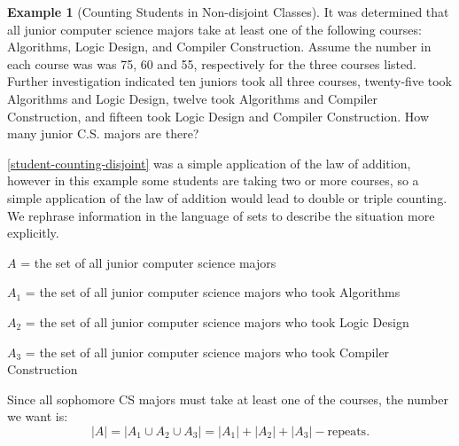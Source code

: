 \documentclass[10pt,]{book}
\theoremstyle{plain}
\theoremstyle{definition}
\newtheorem{example}[theorem]{Example}
\begin{document}
\begin{example}[Counting Students in Non-disjoint Classes]\label{student-counting-nondisjoint}
It was determined that all junior computer science majors take at least one of the following courses: Algorithms, Logic Design, and Compiler Construction. Assume the number in each course was was 75, 60 and 55, respectively for the three courses listed. Further investigation indicated ten juniors took all three courses, twenty-five took  Algorithms and Logic Design, twelve took Algorithms and Compiler Construction, and fifteen took Logic Design and Compiler Construction. How many junior C.S. majors are there?
%
\par
\hyperref[student-counting-disjoint]{\ref{student-counting-disjoint}} was a simple application of the law of addition, however in this example some students are taking two or more courses, so a simple application of the law of addition would lead to double or triple counting. We rephrase information in the language of sets to describe the situation more explicitly.
%
\par

 \(A\) = the set of all junior computer science majors
%
\par

  \(A_1\) = the set of all junior computer science majors who took Algorithms
%
\par

  \(A_2\) = the set of all junior computer science majors who took Logic Design
%
\par

  \(A_3\) = the set of all junior computer science majors who took Compiler Construction
%
\par

 Since all sophomore CS majors must take at least one of the courses, the number we want is:
 \[\lvert A \rvert = \lvert A_1 \cup A_2 \cup A_3 \rvert = \lvert A_1 \rvert + \lvert A_2 \rvert + \lvert A_3 \rvert - \textrm{repeats}.\]
%
\par


\end{example}
\end{document}
